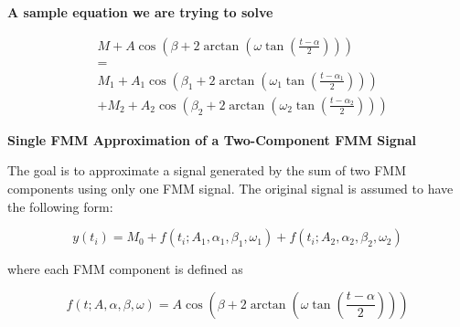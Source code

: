\documentclass{book}
\providecommand{\ProjectDeepHeading}[2]{%
    \par\medskip\noindent\textbf{#2}\par\smallskip
}
\begin{document}
\ProjectDeepHeading{11}{A sample equation we are trying to solve}
        \[
            \begin{aligned}
                &M
                +
                A\cos\left(
                         \ensuremath{\beta}
                         +
                         2\arctan\left(
                                     \ensuremath{\omega}\tan\left(\frac{t-\ensuremath{\alpha}}{2}\right)
                    \right)
                \right)
                \\
                &=
                \\
                &M_1
                +
                A_1\cos\left(
                           \ensuremath{\beta}_1
                    +
                    2\arctan\left(
                                \ensuremath{\omega}_1\tan\left(\frac{t-\ensuremath{\alpha}_1}{2}\right)
                    \right)
                \right)
                \\
                &+
                M_2
                +
                A_2\cos\left(
                           \ensuremath{\beta}_2
                    +
                    2\arctan\left(
                                \ensuremath{\omega}_2\tan\left(\frac{t-\ensuremath{\alpha}_2}{2}\right)
                    \right)
                \right)
            \end{aligned}
        \]
    
    
    \ProjectDeepHeading{11}{Single FMM Approximation of a Two-Component FMM Signal}
        
        The goal is to approximate a signal generated by the sum of two FMM components using only one FMM signal. The original signal is assumed to have the following form:
        
        \[
            y(t_i)
            =
            M_0
            +
            f(t_i; A_1,\ensuremath{\alpha}_1,\ensuremath{\beta}_1,\ensuremath{\omega}_1)
            +
            f(t_i; A_2,\ensuremath{\alpha}_2,\ensuremath{\beta}_2,\ensuremath{\omega}_2)
        \]
        
        where each FMM component is defined as
        
        \[
            f(t; A,\ensuremath{\alpha},\ensuremath{\beta},\ensuremath{\omega})
            =
            A
            \cos
            \left(
                \ensuremath{\beta}
                +
                2
                \arctan
                \left(
                    \ensuremath{\omega}
                    \tan
                    \left(
                        \frac{t-\ensuremath{\alpha}}{2}
                    \right)
                \right)
            \right)
        \]
        
\end{document}
